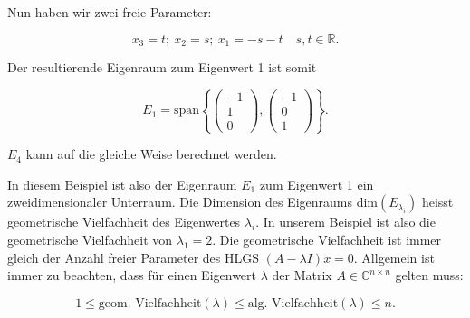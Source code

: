 \vspace{0.25\baselineskip}

Nun haben wir zwei freie Parameter:

\begin{equation*}
    x_3 = t;\ x_2 = s;\ x_1 = -s - t \quad s, t \in \mathbb{R}.
\end{equation*}

Der resultierende Eigenraum zum Eigenwert 1 ist somit

\begin{equation*}
    E_1 = \text{span} \left\{ \begin{pmatrix} -1 \\ 1 \\ 0 \end{pmatrix}, \begin{pmatrix} -1 \\ 0 \\ 1 \end{pmatrix} \right\}.
\end{equation*}

\( E_4 \) kann auf die gleiche Weise berechnet werden.

\vspace{\baselineskip}

In diesem Beispiel ist also der Eigenraum \( E_1 \) zum Eigenwert 1 ein zweidimensionaler Unterraum. Die Dimension des Eigenraums dim\( (E_{\lambda_i}) \) heisst geometrische Vielfachheit des Eigenwertes \( \lambda_i \). In unserem Beispiel ist also die geometrische Vielfachheit von \( \lambda_1 =  2 \). Die geometrische Vielfachheit ist immer gleich der Anzahl freier Parameter des HLGS \( (A - \lambda I)x = 0 \). Allgemein ist immer zu beachten, dass für einen Eigenwert \( \lambda \) der Matrix \( A \in \mathbb{C}^{n \times n} \) gelten muss:

\begin{equation*}
    1 \leq \text{geom. Vielfachheit}(\lambda) \leq \text{alg. Vielfachheit}(\lambda) \leq n.
\end{equation*}